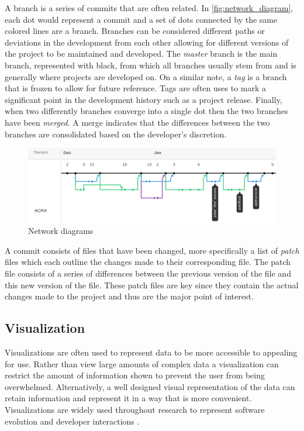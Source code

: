 A branch is a series of commits that are often related. In \autoref{fig:network_diagram}, each dot would represent a commit and a set of dots connected by the same colored lines are a branch. Branches can be considered different paths or deviations in the development from each other allowing for different versions of the project to be maintained and developed. The \textit{master} branch is the main branch, represented with black, from which all branches usually stem from and is generally where projects are developed on. On a similar note, a \textit{tag} is a branch that is frozen to allow for future reference. Tags are often uses to mark a significant point in the development history such as a project release. Finally, when two differently branches converge into a single dot then the two branches have been \textit{merged}. A merge indicates that the differences between the two branches are consolidated based on the developer's discretion.

\begin{figure}[!ht]
    \centering
        \includegraphics[width=1.0\textwidth]{images/network}
    \caption{Network diagrams}
    \label{fig:network_diagram}
\end{figure}

A commit consists of files that have been changed, more specifically a list of \textit{patch} files which each outline the changes made to their corresponding file. The patch file consists of a series of differences between the previous version of the file and this new version of the file. These patch files are key since they contain the actual changes made to the project and thus are the major point of interest.



\subsection{Visualization}

Visualizations are often used to represent data to be more accessible to appealing for use. Rather than view large amounts of complex data a visualization can restrict the amount of information shown to prevent the user from being overwhelmed. Alternatively, a well designed visual representation of the data can retain information and represent it in a way that is more convenient. Visualizations are widely used throughout research to represent software evolution \cite{Bieman2003a, Collberg2003, Gall2006, Keim2002, Ma2008, Salamanca2009} and developer interactions \cite{DeSouza2007, Gilbert2007, Ma2008, Ogawa2010, Salamanca2009}.

